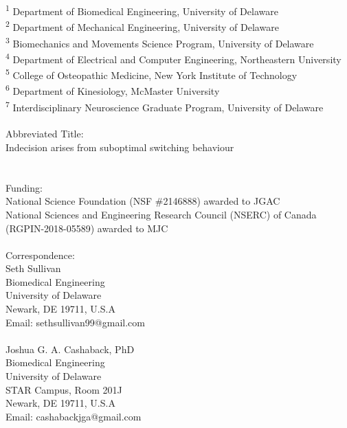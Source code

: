 \documentclass[12pt]{article}
\begin{document}
\noindent \textsuperscript{1} Department of Biomedical Engineering, University of Delaware\\
\textsuperscript{2} Department of Mechanical Engineering, University of Delaware\\
\textsuperscript{3} Biomechanics and Movements Science Program, University of Delaware\\
\textsuperscript{4} Department of Electrical and Computer Engineering, Northeastern University\\
\textsuperscript{5} College of Osteopathic Medicine, New York Institute of Technology\\
\textsuperscript{6} Department of Kinesiology, McMaster University\\
\textsuperscript{7} Interdisciplinary Neuroscience Graduate Program, University of Delaware\\
\vspace{1mm}
\\
\textcolor{mydarkblue}{\large Abbreviated Title:}
\vspace{1mm}
\\
Indecision arises from suboptimal switching behaviour
\\
\vspace{1mm}
\\
\\
\textcolor{mydarkblue}{\large Funding:}
\vspace{1mm}
\\
National Science Foundation (NSF \#2146888) awarded to JGAC
\\
National Sciences and Engineering Research Council (NSERC) of Canada (RGPIN-2018-05589) awarded to MJC
\\
\vspace{1mm}
\\
\textcolor{mydarkblue}{\large Correspondence:}
\\
Seth Sullivan\\
Biomedical Engineering\\
University of Delaware\\
Newark, DE 19711, U.S.A\\
Email: sethsullivan99@gmail.com
\\
\\
Joshua G. A. Cashaback, PhD\\
Biomedical Engineering\\
University of Delaware\\
STAR Campus, Room 201J\\
Newark, DE 19711, U.S.A\\
Email: cashabackjga@gmail.com
\end{document}
